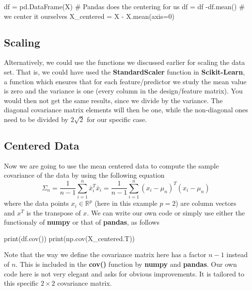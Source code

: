 \documentclass[%
oneside,                 %
final,                   %
10pt]{article}
\begin{document}
\bpycod
df = pd.DataFrame(X)
# Pandas does the centering for us
df = df -df.mean()
# we center it ourselves
X_centered = X - X.mean(axis=0)

\epycod


\subsection{Scaling}
Alternatively, we could use the functions we discussed
earlier for scaling the data set.  That is, we could have used the
\textbf{StandardScaler} function in \textbf{Scikit-Learn}, a function which ensures
that for each feature/predictor we study the mean value is zero and
the variance is one (every column in the design/feature matrix).  You
would then not get the same results, since we divide by the
variance. The diagonal covariance matrix elements will then be one,
while the non-diagonal ones need to be divided by $2\sqrt{2}$ for our
specific case.

\subsection{Centered Data}

Now we are going to use the mean centered data to compute the sample covariance of the data by using the following equation
\begin{equation*}
\Sigma_n = \frac{1}{n-1} \sum_{i=1}^n \bar{x}_i^T \bar{x}_i = \frac{1}{n-1} \sum_{i=1}^n (x_i - \mu_n)^T (x_i - \mu_n)
\end{equation*}
where the data points $x_i \in \mathbb{R}^p$ (here in this example $p = 2$) are column vectors and $x^T$ is the transpose of $x$.
We can write our own code or simply use either the functionaly of \textbf{numpy} or that of \textbf{pandas}, as follows



\bpycod
print(df.cov())
print(np.cov(X_centered.T))

\epycod

Note that the way we define the covariance matrix here has a factor $n-1$ instead of $n$. This is included in the \textbf{cov()} function by \textbf{numpy} and \textbf{pandas}. 
Our own code here is not very elegant and asks for obvious improvements. It is tailored to this specific $2\times 2$ covariance matrix. 
\end{document}
